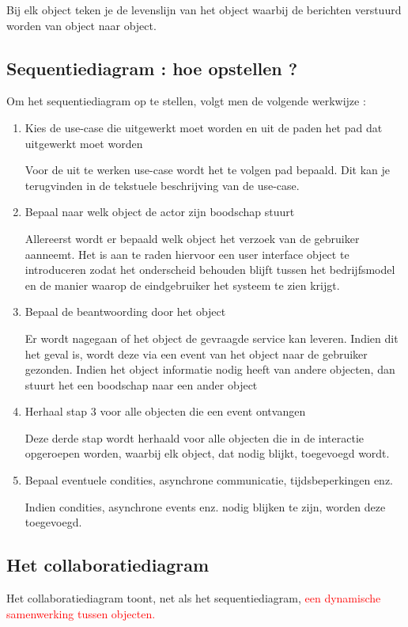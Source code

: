 {Bij elk object teken je de levenslijn van het object waarbij de berichten verstuurd worden van object naar object.
\newpage
\subsection{Sequentiediagram : hoe opstellen ?}

Om het sequentiediagram op te stellen, volgt men de volgende werkwijze :

\begin{enumerate}
\item Kies de use-case die uitgewerkt moet worden en uit de paden het pad dat uitgewerkt moet worden


Voor de uit te werken use-case wordt het te volgen pad bepaald. Dit kan je terugvinden in de tekstuele beschrijving van de use-case.
\item Bepaal naar welk object de actor zijn boodschap stuurt


Allereerst wordt er bepaald welk object het verzoek van de gebruiker aanneemt. Het is aan te raden hiervoor een user interface object te introduceren zodat het onderscheid behouden blijft tussen het bedrijfsmodel en de manier waarop de eindgebruiker het systeem te zien krijgt.
\item Bepaal de beantwoording door het object


Er wordt nagegaan of het object de gevraagde service kan leveren. Indien dit het geval is, wordt deze via een event van het object naar de gebruiker gezonden. Indien het object informatie nodig heeft van andere objecten, dan stuurt het een boodschap naar een ander object
\item Herhaal stap 3 voor alle objecten die een event ontvangen


Deze derde stap wordt herhaald voor alle objecten die in de interactie opgeroepen worden, waarbij elk object, dat nodig blijkt, toegevoegd wordt.
\item Bepaal eventuele condities, asynchrone communicatie, tijdsbeperkingen enz.


Indien condities, asynchrone events enz. nodig blijken te zijn, worden deze toegevoegd.
\end{enumerate}


\subsection{Het collaboratiediagram}

Het collaboratiediagram toont, net als het sequentiediagram, \textcolor{red}{een dynamische samenwerking tussen objecten.}

}
